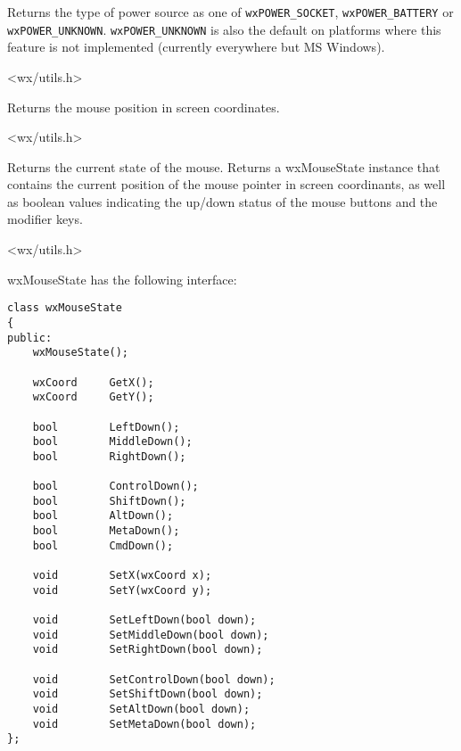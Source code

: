 \label{wxgetpowertype}


Returns the type of power source as one of \texttt{wxPOWER\_SOCKET},
\texttt{wxPOWER\_BATTERY} or \texttt{wxPOWER\_UNKNOWN}.
\texttt{wxPOWER\_UNKNOWN} is also the default on platforms where this
feature is not implemented (currently everywhere but MS Windows).


<wx/utils.h>


\label{wxgetmouseposition}


Returns the mouse position in screen coordinates.


<wx/utils.h>


\label{wxgetmousestate}


Returns the current state of the mouse.  Returns a wxMouseState
instance that contains the current position of the mouse pointer in
screen coordinants, as well as boolean values indicating the up/down
status of the mouse buttons and the modifier keys.


<wx/utils.h>

wxMouseState has the following interface:

\begin{verbatim}
class wxMouseState
{
public:
    wxMouseState();

    wxCoord     GetX();
    wxCoord     GetY();

    bool        LeftDown();
    bool        MiddleDown();
    bool        RightDown();

    bool        ControlDown();
    bool        ShiftDown();
    bool        AltDown();
    bool        MetaDown();
    bool        CmdDown();

    void        SetX(wxCoord x);
    void        SetY(wxCoord y);

    void        SetLeftDown(bool down);
    void        SetMiddleDown(bool down);
    void        SetRightDown(bool down);

    void        SetControlDown(bool down);
    void        SetShiftDown(bool down);
    void        SetAltDown(bool down);
    void        SetMetaDown(bool down);
};
\end{verbatim}


